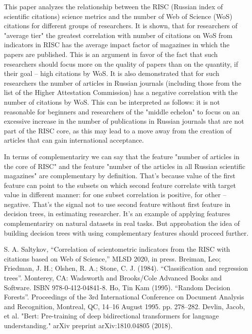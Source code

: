 \documentclass[conference]{IEEEtran}
\theoremstyle{definition}
\begin{document}
This paper \cite{mlsd2020} analyzes the relationship between the RISC (Russian index of scientific citations) science metrics and the number of Web of Science (WoS) citations for different groups of researchers. It is shown, that for researchers of "average tier" the greatest correlation with number of citations on WoS from indicators in RISC has the average impact factor of magazines in which the papers are published. This is an argument in favor of the fact that such researchers should focus more on the quality of papers than on the quantity, if their goal -- high citations by WoS. It is also demonstrated that for such researchers the number of articles in Russian journals (including those from the list of the Higher Attestation Commission) has a negative correlation with the number of citations by WoS. This can be interpreted as follows: it is not reasonable for beginners and researchers of the "middle echelon" to focus on an excessive increase in the number of publications in Russian journals that are not part of the RISC core, as this may lead to a move away from the creation of articles that can gain international acceptance.


In terms of complementariry we can say that the feature "number of articles in the core of RISC" and the feature "number of the articles in all Russian scientific magazines" are complementary by definition. That's because value of the first feature can point to the subsets on which second feature correlate with target value in different manner: for one subset correlation is positive, for other -- negative. That's the signal not to use second feature without first feature in decision trees, in estimating researcher. It's an example of applying features complementariry on natural datasets in real tasks. But approbation the idea of building decision trees with using complementary features should proceed further. 

\begin{thebibliography}{00}
 S. A. Saltykov, ``Correlation of scientometric indicators from the RISC with citations based on Web of Science,'' MLSD 2020, in press.
 Breiman, Leo; Friedman, J. H.; Olshen, R. A.; Stone, C. J. (1984). ``Classification and regression trees''. Monterey, CA: Wadsworth and Brooks/Cole Advanced Books and Software. ISBN 978-0-412-04841-8.
 Ho, Tin Kam (1995). ``Random Decision Forests''. Proceedings of the 3rd International Conference on Document Analysis and Recognition, Montreal, QC, 14–16 August 1995. pp. 278–282.
 Devlin, Jacob, et al. "Bert: Pre-training of deep bidirectional transformers for language understanding." arXiv preprint arXiv:1810.04805 (2018).
\end{thebibliography}
\end{document}
